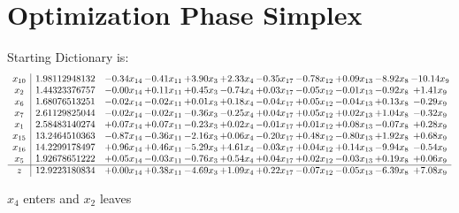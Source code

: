 \documentclass[9pt]{article}
\begin{document}
\section{Optimization Phase Simplex}
Starting Dictionary is:
\[\begin{array}{c| c c@{\hskip 2pt} c@{\hskip 2pt} c@{\hskip 2pt} c@{\hskip 2pt} c@{\hskip 2pt} c@{\hskip 2pt} c@{\hskip 2pt} c@{\hskip 2pt} c@{\hskip 2pt} }
 x_{10}   &  1.98112948132 & -0.34 x_{14} & -0.41 x_{11} & +  3.90 x_{3} & +  2.33 x_{4} & -0.35 x_{17} & -0.78 x_{12} & +  0.09 x_{13} & -8.92 x_{8} & -10.14 x_{9}\\
 x_{2}   &  1.44323376757 & -0.00 x_{14} & +  0.11 x_{11} & +  0.45 x_{3} & -0.74 x_{4} & +  0.03 x_{17} & -0.05 x_{12} & -0.01 x_{13} & -0.92 x_{8} & +  1.41 x_{9}\\
 x_{6}   &  1.68076513251 & -0.02 x_{14} & -0.02 x_{11} & +  0.01 x_{3} & +  0.18 x_{4} & -0.04 x_{17} & +  0.05 x_{12} & -0.04 x_{13} & +  0.13 x_{8} & -0.29 x_{9}\\
 x_{7}   &  2.61129825044 & -0.02 x_{14} & -0.02 x_{11} & -0.36 x_{3} & -0.25 x_{4} & +  0.04 x_{17} & +  0.05 x_{12} & +  0.02 x_{13} & +  1.04 x_{8} & -0.32 x_{9}\\
 x_{1}   &  2.58483140274 & +  0.07 x_{14} & +  0.07 x_{11} & -0.23 x_{3} & +  0.02 x_{4} & -0.01 x_{17} & +  0.01 x_{12} & +  0.08 x_{13} & -0.07 x_{8} & +  0.28 x_{9}\\
 x_{15}   &  13.2464510363 & -0.87 x_{14} & -0.36 x_{11} & -2.16 x_{3} & +  0.06 x_{4} & -0.20 x_{17} & +  0.48 x_{12} & -0.80 x_{13} & +  1.92 x_{8} & +  0.68 x_{9}\\
 x_{16}   &  14.2299178497 & +  0.96 x_{14} & +  0.46 x_{11} & -5.29 x_{3} & +  4.61 x_{4} & -0.03 x_{17} & +  0.04 x_{12} & +  0.14 x_{13} & -9.94 x_{8} & -0.54 x_{9}\\
 x_{5}   &  1.92678651222 & +  0.05 x_{14} & -0.03 x_{11} & -0.76 x_{3} & +  0.54 x_{4} & +  0.04 x_{17} & +  0.02 x_{12} & -0.03 x_{13} & +  0.19 x_{8} & +  0.06 x_{9}\\
\hline
z    &  12.9223180834 & +  0.00 x_{14} & +  0.38 x_{11} & -4.69 x_{3} & +  1.09 x_{4} & +  0.22 x_{17} & -0.07 x_{12} & -0.05 x_{13} & -6.39 x_{8} & +  7.08 x_{9}\\
\end{array}\]


 $ x_{4} $ enters and $ x_{2} $ leaves 
\end{document}
